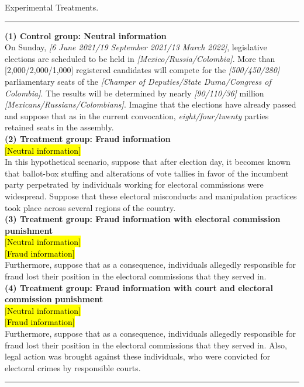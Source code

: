 \documentclass[11pt, ngerman,english,a4]{article}
\begin{document}
\singlespacing
\begin{table}[H]
    \caption{Experimental Treatments.}
    \label{tab:treatments}

\hrule 
\vspace{0.5cm}
\textbf{(1) Control group: Neutral information} \\
On Sunday, \textit{[6 June 2021/19 September 2021/13 March 2022]}, legislative elections are scheduled to be held in \textit{[Mexico/Russia/Colombia]}. 
More than [2,000/2,000/1,000] registered candidates will compete for the \textit{[500/450/280]} parliamentary seats of the \textit{[Champer of Deputies/State Duma/Congress of Colombia]}. 
The results will be determined by nearly \textit{[90/110/36]} million \textit{[Mexicans/Russians/Colombians]}.
Imagine that the elections have already passed and suppose that as in the current convocation, \textit{eight/four/twenty} parties retained seats in the assembly. \\

\textbf{(2) Treatment group: Fraud information} \\
\hl{$[$Neutral information$]$} \\
In this hypothetical scenario, suppose that after election day, it becomes known that ballot-box stuffing and alterations of vote tallies in favor of the incumbent party perpetrated by individuals working for electoral commissions were widespread. 
Suppose that these electoral misconducts and manipulation practices took place across several regions of the country. \\


\textbf{(3) Treatment group: Fraud information with electoral commission punishment} \\ 
\hl{$[$Neutral information$]$} \\
\hl{$[$Fraud information$]$} \\
Furthermore, suppose that as a consequence, individuals allegedly responsible for fraud lost their position in the electoral commissions that they served in.\\

\textbf{(4) Treatment group: Fraud information with court and electoral commission punishment} \\
\hl{$[$Neutral information$]$} \\
\hl{$[$Fraud information$]$} \\
Furthermore, suppose that as a consequence, individuals allegedly responsible for fraud lost their position in the electoral commissions that they served in. 
Also, legal action was brought against these individuals, who were convicted for electoral crimes by responsible courts.
\vspace{0.5cm}
\hrule
\end{table}
\end{document}
